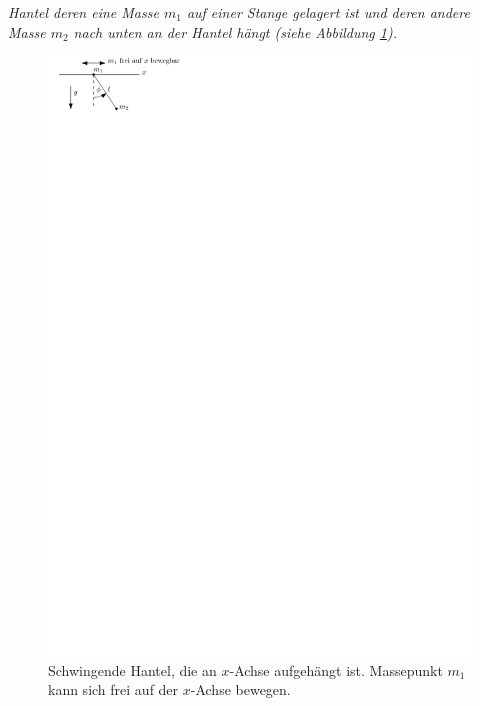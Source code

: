 \begin{beispiel*}
	\textit{Hantel deren eine Masse $m_1$ auf einer Stange gelagert ist und deren andere Masse $m_2$ nach unten an der Hantel hängt (siehe Abbildung \ref{fig:ch1_schwingendehantel}).}
	
	\begin{figure}[h]
		\centering
		\includegraphics[scale=1.5]{figures/ch1/schwingendehantel}
		\caption{Schwingende Hantel, die an $x$-Achse aufgehängt ist. Massepunkt $m_1$ kann sich frei auf der $x$-Achse bewegen.}
		\label{fig:ch1_schwingendehantel}	
	\end{figure}
	

\end{beispiel*}
